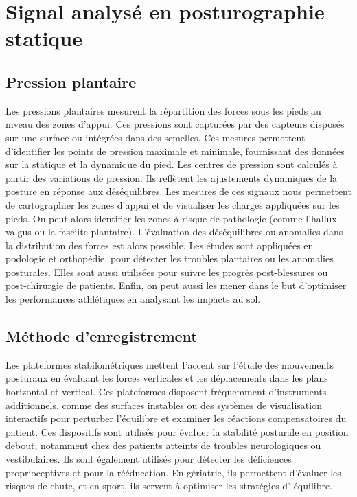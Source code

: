 \section{Signal analysé en posturographie statique}

\subsection{Pression plantaire}

Les pressions plantaires mesurent la répartition des forces sous les pieds au niveau des zones d’appui.
Ces pressions sont capturées par des capteurs disposés sur une surface ou intégrées dans des semelles.
Ces mesures permettent d’identifier les points de pression maximale et minimale, fournissant des données sur la statique et la dynamique du pied.
Les centres de pression sont calculés à partir des variations de pression.
Ils reflètent les ajustements dynamiques de la posture en réponse aux déséquilibres.
Les mesures de ces signaux nous permettent de cartographier les zones d'appui et de visualiser les charges appliquées sur les pieds.
On peut alors identifier les zones à risque de pathologie (comme l’hallux valgus ou la fasciite plantaire).
L'évaluation des déséquilibres ou anomalies dans la distribution des forces est alors possible.
Les études sont appliquées en podologie et orthopédie, pour détecter les troubles plantaires ou les anomalies posturales.
Elles sont aussi utilisées pour suivre les progrès post-blessures ou post-chirurgie de patients.
Enfin, on peut aussi les mener dans le but d’optimiser les performances athlétiques en analysant les impacts au sol.

\subsection{Méthode d'enregistrement}

Les plateformes stabilométriques mettent l’accent sur l'étude des mouvements posturaux en évaluant les forces verticales et les déplacements dans les plans horizontal et vertical.
Ces plateformes disposent fréquemment d’instruments additionnels, comme des surfaces instables ou des systèmes de visualisation interactifs pour perturber l'équilibre et examiner les réactions compensatoires du patient.
Ces dispositifs sont utilisés pour évaluer la stabilité posturale en position debout, notamment chez des patients atteints de troubles neurologiques ou vestibulaires.
Ils sont également utilisés pour détecter les déficiences proprioceptives et pour la rééducation.
En gériatrie, ils permettent d'évaluer les risques de chute, et en sport, ils servent à optimiser les stratégies d' équilibre.

